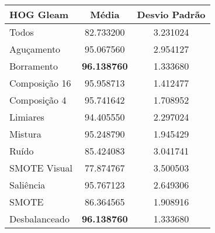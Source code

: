 


\begin{table}[!htbp]
\centering
\caption{}
\label{tab:resultados:x:melhor}
\begin{tabular}{|l|c|c|}
\hline
\textbf{HOG Gleam} & \textbf{Média}     & \textbf{Desvio Padrão} \\ \hline
   Todos        &  82.733200 &  3.231024  \\ \hline
  Aguçamento    &  95.067560 &  2.954127  \\ \hline
  Borramento    &  \textbf{96.138760} &  1.333680  \\ \hline
  Composição 16 &  95.958713 &  1.412477  \\ \hline
  Composição 4  &  95.741642 &  1.708952  \\ \hline
  Limiares      &  94.405550 &  2.297024  \\ \hline
  Mistura       &  95.248790 &  1.945429  \\ \hline
  Ruído         &  85.424083 &  3.041741  \\ \hline
  SMOTE Visual  &  77.874767 &  3.500503  \\ \hline
  Saliência     &  95.767123 &  2.649306  \\ \hline
 SMOTE          &  86.364565 &  1.908916  \\ \hline
Desbalanceado   &  \textbf{96.138760} &  1.333680  \\ \hline
\end{tabular}
\end{table}

